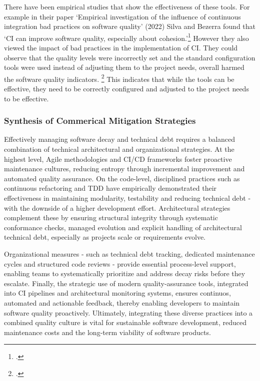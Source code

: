 There have been empirical studies that show the effectiveness of these tools. For example in their paper `Empirical investigation of the influence of continuous integration bad practices on software quality' (2022)
Silva and Bezerra found that `CI can improve software quality, especially about cohesion.'\footcite[4]{silvaEmpiricalInvestigationInfluence2022} However they also viewed the impact
of bad practices in the implementation of CI. They could observe that the quality levels were incorrectly set and the standard configuration tools were used instead of 
adjusting them to the project needs, overall harmed the software quality indicators. \footcite[4]{silvaEmpiricalInvestigationInfluence2022}
This indicates that while the tools can be effective, they need to be correctly configured and adjusted to the project needs to be effective.\\

\subsubsection{Synthesis of Commerical Mitigation Strategies}
Effectively managing software decay and technical debt requires a balanced combination of technical architectural and organizational strategies.
At the highest level, Agile methodologies and \ac{CI/CD} frameworks foster proactive maintenance cultures, reducing entropy through incremental improvement
and automated quality assurance. On the code-level, disciplined practices such as continuous refactoring and \ac{TDD} have empirically demonstrated their effectiveness
in maintaining modularity, testability and reducing technical debt - with the downside of a higher development effort. Architectural strategies complement these
by ensuring structural integrity through systematic conformance checks, managed evolution and explicit handling of architectural technical debt, especially as
projects scale or requirements evolve.

Organizational measures - such as technical debt tracking, dedicated maintenance cycles and structured code reviews - provide essential process-level support,
enabling teams to systematically prioritize and address decay risks before they escalate. Finally, the strategic use of modern quality-assurance tools, integrated
into \ac{CI} pipelines and architectural monitoring systems, ensures continuos, automated and actionable feedback, thereby enabling developers to maintain
software quality proactively. Ultimately, integrating these diverse practices into a combined quality culture is vital for sustainable software development,
reduced maintenance costs and the long-term viability of software products.\\


